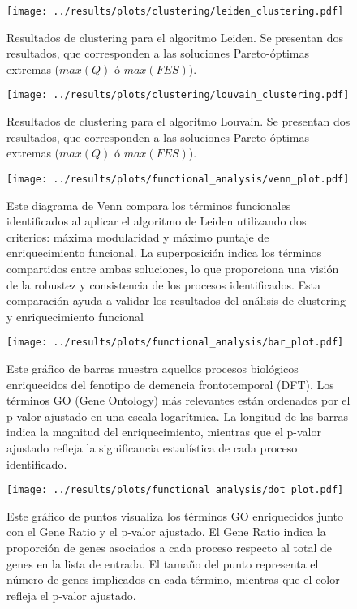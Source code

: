 \begin{figure}[htbp!]
	\centering
	\texttt{[image: ../results/plots/clustering/leiden\_clustering.pdf]}
	\caption{Resultados de clustering para el algoritmo Leiden. Se presentan dos resultados, que corresponden a las soluciones Pareto-óptimas extremas (\(max(Q)\) ó \(max(FES)\)).}
	\label{fig:leiden_clustering}
\end{figure}

\begin{figure}[htbp!]
	\centering
	\texttt{[image: ../results/plots/clustering/louvain\_clustering.pdf]}
	\caption{Resultados de clustering para el algoritmo Louvain. Se presentan dos resultados, que corresponden a las soluciones Pareto-óptimas extremas (\(max(Q)\) ó \(max(FES)\)).}
	\label{fig:louvain_clustering}
\end{figure}

\begin{figure}[htbp!]
	\centering
	\texttt{[image: ../results/plots/functional\_analysis/venn\_plot.pdf]}
	\caption{Este diagrama de Venn compara los términos funcionales identificados al aplicar el algoritmo de Leiden utilizando dos criterios: máxima modularidad y máximo puntaje de enriquecimiento funcional. La superposición indica los términos compartidos entre ambas soluciones, lo que proporciona una visión de la robustez y consistencia de los procesos identificados. Esta comparación ayuda a validar los resultados del análisis de clustering y enriquecimiento funcional}
	\label{fig:venn_plot}
\end{figure}


\begin{figure}[htbp!]
	\centering
	\texttt{[image: ../results/plots/functional\_analysis/bar\_plot.pdf]}
	\caption{Este gráfico de barras muestra aquellos procesos biológicos enriquecidos del fenotipo de demencia frontotemporal (DFT). Los términos GO (Gene Ontology) más relevantes están ordenados por el p-valor ajustado en una escala logarítmica. La longitud de las barras indica la magnitud del enriquecimiento, mientras que el p-valor ajustado refleja la significancia estadística de cada proceso identificado.}
	\label{fig:bar_plot}
\end{figure}

\begin{figure}[htbp!]
	\centering
	\texttt{[image: ../results/plots/functional\_analysis/dot\_plot.pdf]}
	\caption{Este gráfico de puntos visualiza los términos GO enriquecidos junto con el Gene Ratio y el p-valor ajustado. El Gene Ratio indica la proporción de genes asociados a cada proceso respecto al total de genes en la lista de entrada. El tamaño del punto representa el número de genes implicados en cada término, mientras que el color refleja el p-valor ajustado.}
	\label{fig:dot_plot}
\end{figure}

